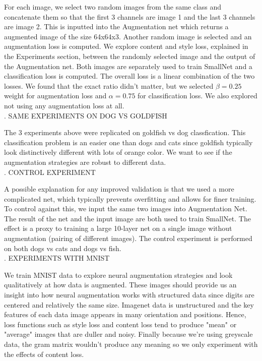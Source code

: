\documentclass[10pt,twocolumn,letterpaper]{article}
\begin{document}
For each image, we select two random images from the same class and concatenate them so that the first 3 channels are image 1 and the last 3 channels are image 2. This is inputted into the Augmentation net which returns a augmented image of the size 64x64x3. Another random image is selected and an augmentation loss is computed. We explore content and style loss, explained in the Experiments section, between the randomly selected image and the output of the Augmentation net. Both images are separately used to train SmallNet and a classification loss is computed. The overall loss is a linear combination of the two losses. We found that the exact ratio didn't matter, but we selected $\beta = 0.25$ weight for augmentation loss and $\alpha = 0.75$ for classification loss. We also explored not using any augmentation loss at all. \\

. SAME EXPERIMENTS ON DOG VS GOLDFISH 

The 3 experiments above were replicated on goldfish vs dog classfication. This classification problem is an easier one than dogs and cats since goldfish typically look distinctively different with lots of orange color. We want to see if the augmentation strategies are robust to different data. \\

. CONTROL EXPERIMENT 

A possible explanation for any improved validation is that we used a more complicated net, which typically prevents overfitting and allows for finer training. To control against this, we input the same two images into Augmentation Net. The result of the net and the input image are both used to train SmallNet. The effect is a proxy to training a large 10-layer net on a single image without augmentation (pairing of different images). The control experiment is performed on both dogs vs cats and dogs vs fish. \\

. EXPERIMENTS WITH MNIST 

We train MNIST data to explore neural augmentation strategies and look qualitatively at how data is augmented. These images should provide us an insight into how neural augmentation works with structured data since digits are centered and relatively the same size. Imagenet data is unstructured and the key features of each data image appears in many orientation and positions. Hence, loss functions such as style loss and content loss tend to produce "mean" or "average" images that are duller and noisy. Finally because we're using greyscale data, the gram matrix wouldn't produce any meaning so we only experiment with the effects of content loss. \\
\end{document}
